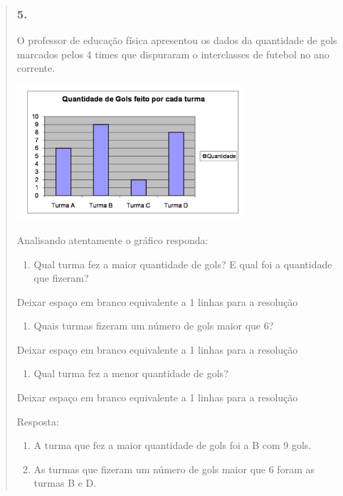 \begin{enumerate}
\begin{escolha}
\begin{enumerate}
\begin{itemize}
\begin{itemize}
\begin{escolha}
\begin{quote}
\begin{escolha}
{\subsubsection{5.}\label{section-95}

O professor de educação física apresentou os dados da quantidade de gols
marcados pelos 4 times que dispuraram o interclasses de futebol no ano
corrente.

\includegraphics[width=3.30769in,height=1.97201in]{media/image97.png}

Analisando atentamente o gráfico responda:

\begin{enumerate}
\def\labelenumi{\alph{enumi})}
\item
  Qual turma fez a maior quantidade de gols? E qual foi a quantidade que
  fizeram?
\end{enumerate}

Deixar espaço em branco equivalente a 1 linhas para a resolução

\begin{enumerate}
\def\labelenumi{\alph{enumi})}
\item
  Quais turmas fizeram um número de gols maior que 6?
\end{enumerate}

Deixar espaço em branco equivalente a 1 linhas para a resolução

\begin{enumerate}
\def\labelenumi{\alph{enumi})}
\item
  Qual turma fez a menor quantidade de gols?
\end{enumerate}

Deixar espaço em branco equivalente a 1 linhas para a resolução

Resposta:

\begin{enumerate}
\def\labelenumi{\alph{enumi})}
\item
  A turma que fez a maior quantidade de gols foi a B com 9 gols.
\item
  As turmas que fizeram um número de gols maior que 6 foram as turmas B
  e D.
\end{enumerate}

}
\end{escolha}
\end{quote}
\end{escolha}
\end{itemize}
\end{itemize}
\end{enumerate}
\end{escolha}
\end{enumerate}
